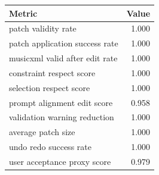 \begin{tabular}{lr}
\toprule
Metric & Value \\
\midrule
patch validity rate & 1.000 \\
patch application success rate & 1.000 \\
musicxml valid after edit rate & 1.000 \\
constraint respect score & 1.000 \\
selection respect score & 1.000 \\
prompt alignment edit score & 0.958 \\
validation warning reduction & 1.000 \\
average patch size & 1.000 \\
undo redo success rate & 1.000 \\
user acceptance proxy score & 0.979 \\
\bottomrule
\end{tabular}
